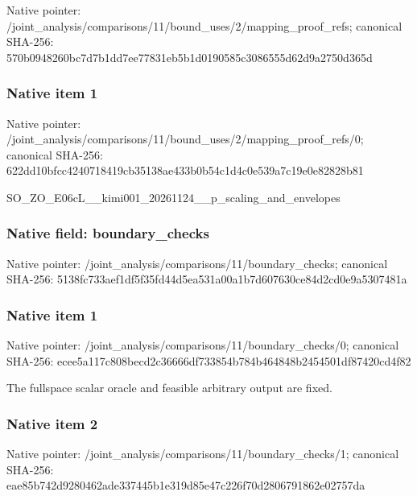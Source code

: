 \documentclass[10pt,a4paper]{article}
\begin{document}
Native pointer: /joint\_analysis/comparis\allowbreak{}ons/11/bound\_uses/2/mapp\allowbreak{}ing\_proof\_refs; canonical SHA-256: 570b0948260bc7d7b1dd7ee7\allowbreak{}7831eb5b1d0190585c308655\allowbreak{}5d62d9a2750d365d



\subsubsection{Native item 1}


Native pointer: /joint\_analysis/comparis\allowbreak{}ons/11/bound\_uses/2/mapp\allowbreak{}ing\_proof\_refs/0; canonical SHA-256: 622dd10bfcc4240718419cb3\allowbreak{}5138ae433b0b54c1d4c0e539\allowbreak{}a7c19e0e82828b81


SO\_ZO\_E06cL\_\_kimi001\_202\allowbreak{}61124\_\_p\_scaling\_and\_env\allowbreak{}elopes


\subsubsection{Native field: boundary\_checks}


Native pointer: /joint\_analysis/comparis\allowbreak{}ons/11/boundary\_checks; canonical SHA-256: 5138fc733aef1df5f35fd44d\allowbreak{}5ea531a00a1b7d607630ce84\allowbreak{}d2cd0e9a5307481a



\subsubsection{Native item 1}


Native pointer: /joint\_analysis/comparis\allowbreak{}ons/11/boundary\_checks/0; canonical SHA-256: ecee5a117c808becd2c36666\allowbreak{}df733854b784b464848b2454\allowbreak{}501df87420cd4f82


The fullspace scalar oracle and feasible arbitrary output are fixed.


\subsubsection{Native item 2}


Native pointer: /joint\_analysis/comparis\allowbreak{}ons/11/boundary\_checks/1; canonical SHA-256: eae85b742d9280462ade3374\allowbreak{}45b1e319d85e47c226f70d28\allowbreak{}06791862e02757da
\end{document}
